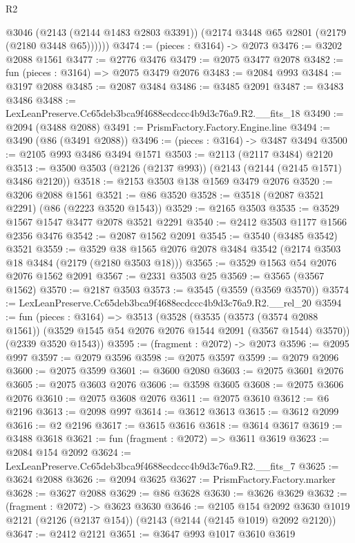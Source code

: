\begin{lexlean}{R2}
\begin{coremodule}
          @3046
          (@2143 (@2144 @1483 @2803 @3391))
          (@2174 @3448 @65 @2801 (@2179 (@2180 @3448 @65))))))
@3474 := (pieces : @3164) -> @2073
@3476 := @3202 @2088 @1561
@3477 := @2776 @3476
@3479 := @2075 @3477 @2078
@3482 := fun (pieces : @3164) => @2075 @3479 @2076
@3483 := @2084 @993
@3484 := @3197 @2088
@3485 := @2087 @3484
@3486 := @3485 @2091
@3487 := @3483 @3486
@3488 := LexLeanPreserve.Cc65deb3bca9f4688ecdccc4b9d3c76a9.R2.__fits_18
@3490 := @2094 (@3488 @2088)
@3491 := PrismFactory.Factory.Engine.line
@3494 := @3490 (@86 (@3491 @2088))
@3496 := (pieces : @3164) -> @3487 @3494
@3500 := @2105 @993 @3486 @3494 @1571
@3503 := @2113 (@2117 @3484) @2120
@3513 := @3500 @3503 (@2126 (@2137 @993)) (@2143 (@2144 (@2145 @1571) @3486 @2120))
@3518 := @2153 @3503 @138 @1569 @3479 @2076
@3520 := @3206 @2088 @1561
@3521 := @86 @3520
@3528 := @3518 (@2087 @3521 @2291) (@86 (@2223 @3520 @1543))
@3529 := @2165 @3503
@3535 := @3529 @1567 @1547 @3477 @2078 @3521 @2291
@3540 := @2412 @3503 @1177 @1566 @2356 @3476
@3542 := @2087 @1562 @2091
@3545 := @3540 (@3485 @3542) @3521
@3559 := @3529 @38 @1565 @2076 @2078 @3484 @3542 (@2174 @3503 @18 @3484 (@2179 (@2180 @3503 @18)))
@3565 := @3529 @1563 @54 @2076 @2076 @1562 @2091
@3567 := @2331 @3503 @25
@3569 := @3565 (@3567 @1562)
@3570 := @2187 @3503
@3573 := @3545 (@3559 (@3569 @3570))
@3574 := LexLeanPreserve.Cc65deb3bca9f4688ecdccc4b9d3c76a9.R2.__rel_20
@3594 := fun (pieces : @3164) =>
  @3513
    (@3528
      (@3535
        (@3573 (@3574 @2088 @1561))
        (@3529 @1545 @54 @2076 @2076 @1544 @2091 (@3567 @1544) @3570))
      (@2339 @3520 @1543))
@3595 := (fragment : @2072) -> @2073
@3596 := @2095 @997
@3597 := @2079 @3596
@3598 := @2075 @3597
@3599 := @2079 @2096
@3600 := @2075 @3599
@3601 := @3600 @2080
@3603 := @2075 @3601 @2076
@3605 := @2075 @3603 @2076
@3606 := @3598 @3605
@3608 := @2075 @3606 @2076
@3610 := @2075 @3608 @2076
@3611 := @2075 @3610
@3612 := @6 @2196
@3613 := @2098 @997
@3614 := @3612 @3613
@3615 := @3612 @2099
@3616 := @2 @2196
@3617 := @3615 @3616
@3618 := @3614 @3617
@3619 := @3488 @3618
@3621 := fun (fragment : @2072) => @3611 @3619
@3623 := @2084 @154 @2092
@3624 := LexLeanPreserve.Cc65deb3bca9f4688ecdccc4b9d3c76a9.R2.__fits_7
@3625 := @3624 @2088
@3626 := @2094 @3625
@3627 := PrismFactory.Factory.marker
@3628 := @3627 @2088
@3629 := @86 @3628
@3630 := @3626 @3629
@3632 := (fragment : @2072) -> @3623 @3630
@3646 := @2105
    @154
    @2092
    @3630
    @1019
    @2121
    (@2126 (@2137 @154))
    (@2143 (@2144 (@2145 @1019) @2092 @2120))
@3647 := @2412 @2121
@3651 := @3647 @993 @1017 @3610 @3619

\end{coremodule}
\end{lexlean}
